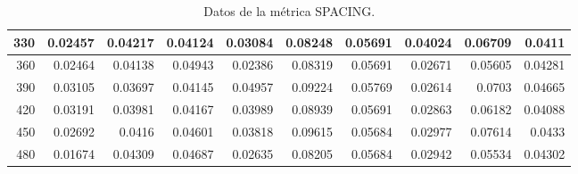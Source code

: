 \begin{table}[h]
\begin{tabular}{|r|r|r|r|r|r|r|r|r|r|}
			\hline \tiny 330 &{\tiny 0.02457}	&{\tiny 0.04217}	&{\tiny 0.04124}	&{\tiny 0.03084}	&{\tiny 0.08248}	&{\tiny 0.05691}	&{\tiny 0.04024}	&{\tiny 0.06709}	&{\tiny 0.0411} \\
			\hline \tiny 360 &{\tiny 0.02464}	&{\tiny 0.04138}	&{\tiny 0.04943}	&{\tiny 0.02386}	&{\tiny 0.08319}	&{\tiny 0.05691}	&{\tiny 0.02671}	&{\tiny 0.05605}	&{\tiny 0.04281} \\
			\hline \tiny 390 &{\tiny 0.03105}	&{\tiny 0.03697}	&{\tiny 0.04145}	&{\tiny 0.04957}	&{\tiny 0.09224}	&{\tiny 0.05769}	&{\tiny 0.02614}	&{\tiny 0.0703}	&{\tiny 0.04665} \\
			\hline \tiny 420 &{\tiny 0.03191}	&{\tiny 0.03981}	&{\tiny 0.04167}	&{\tiny 0.03989}	&{\tiny 0.08939}	&{\tiny 0.05691}	&{\tiny 0.02863}	&{\tiny 0.06182}	&{\tiny 0.04088} \\
			\hline \tiny 450 &{\tiny 0.02692}	&{\tiny 0.0416}	&{\tiny 0.04601}	&{\tiny 0.03818}	&{\tiny 0.09615}	&{\tiny 0.05684}	&{\tiny 0.02977}	&{\tiny 0.07614}	&{\tiny 0.0433} \\
			\hline \tiny 480 &{\tiny 0.01674}	&{\tiny 0.04309}	&{\tiny 0.04687}	&{\tiny 0.02635}	&{\tiny 0.08205}	&{\tiny 0.05684}	&{\tiny 0.02942}	&{\tiny 0.05534}	&{\tiny 0.04302} \\						
			\hline								
		\end{tabular}
		\caption{Datos de la m\'etrica SPACING.}	 
   \label{tabA5}	
\end{table}

